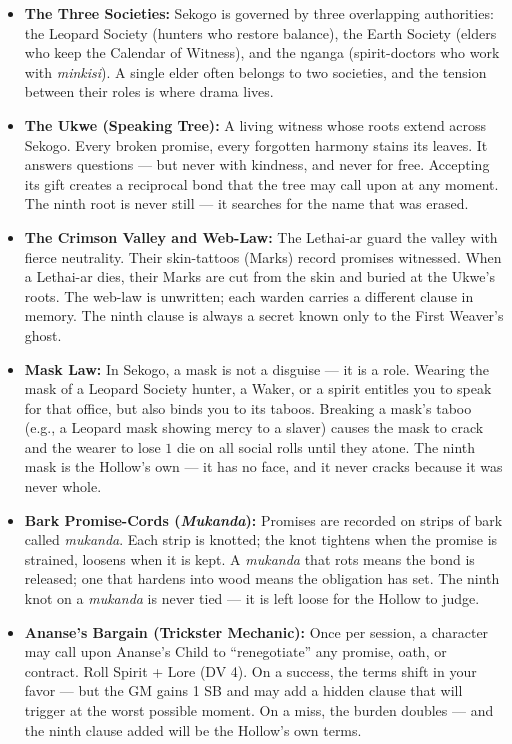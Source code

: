 \begin{itemize}
\item \textbf{The Three Societies:} Sekogo is governed by three overlapping authorities: the Leopard Society (hunters who restore balance), the Earth Society (elders who keep the Calendar of Witness), and the nganga (spirit-doctors who work with \textit{minkisi}). A single elder often belongs to two societies, and the tension between their roles is where drama lives.
\item \textbf{The Ukwe (Speaking Tree):} A living witness whose roots extend across Sekogo. Every broken promise, every forgotten harmony stains its leaves. It answers questions --- but never with kindness, and never for free. Accepting its gift creates a reciprocal bond that the tree may call upon at any moment. The ninth root is never still --- it searches for the name that was erased.
\item \textbf{The Crimson Valley and Web-Law:} The Lethai-ar guard the valley with fierce neutrality. Their skin-tattoos (Marks) record promises witnessed. When a Lethai-ar dies, their Marks are cut from the skin and buried at the Ukwe's roots. The web-law is unwritten; each warden carries a different clause in memory. The ninth clause is always a secret known only to the First Weaver's ghost.
\item \textbf{Mask Law:} In Sekogo, a mask is not a disguise --- it is a role. Wearing the mask of a Leopard Society hunter, a Waker, or a spirit entitles you to speak for that office, but also binds you to its taboos. Breaking a mask's taboo (e.g., a Leopard mask showing mercy to a slaver) causes the mask to crack and the wearer to lose $1$ die on all social rolls until they atone. The ninth mask is the Hollow's own --- it has no face, and it never cracks because it was never whole.
\item \textbf{Bark Promise-Cords (\textit{Mukanda}):} Promises are recorded on strips of bark called \textit{mukanda}. Each strip is knotted; the knot tightens when the promise is strained, loosens when it is kept. A \textit{mukanda} that rots means the bond is released; one that hardens into wood means the obligation has set. The ninth knot on a \textit{mukanda} is never tied --- it is left loose for the Hollow to judge.
\item \textbf{Ananse's Bargain (Trickster Mechanic):} Once per session, a character may call upon Ananse's Child to ``renegotiate'' any promise, oath, or contract. Roll Spirit + Lore (DV 4). On a success, the terms shift in your favor --- but the GM gains 1 SB and may add a hidden clause that will trigger at the worst possible moment. On a miss, the burden doubles --- and the ninth clause added will be the Hollow's own terms.

\end{itemize}
